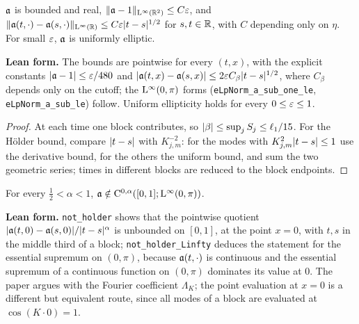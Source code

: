 \begin{proposition}
  \label{prop:coefficient}
  \leanok
  $\mathfrak{a}$ is bounded and real, $\lVert \mathfrak{a}-1\rVert_{\mathrm{L}^\infty(\mathbb{R}^2)}\leq C\varepsilon$, and
  $\lVert \mathfrak{a}(t,\cdot)-\mathfrak{a}(s,\cdot)\rVert_{\mathrm{L}^\infty(\mathbb{R})}\leq C\varepsilon\lvert t-s\rvert^{1/2}$ for $s,t\in\mathbb{R}$,
  with $C$ depending only on $\eta$.  For small $\varepsilon$, $\mathfrak{a}$ is uniformly elliptic.
\end{proposition}

\textbf{Lean form.}  The bounds are pointwise for every $(t,x)$, with the explicit constants
$\lvert \mathfrak{a}-1\rvert\leq\varepsilon/480$ and $\lvert \mathfrak{a}(t,x)-\mathfrak{a}(s,x)\rvert\leq2\varepsilon C_\beta\lvert t-s\rvert^{1/2}$, where
$C_\beta$ depends only on the cutoff; the $\mathrm{L}^\infty(0,\pi)$ forms
(\texttt{eLpNorm\_a\_sub\_one\_le}, \texttt{eLpNorm\_a\_sub\_le}) follow.  Uniform ellipticity
holds for every $0\leq\varepsilon\leq1$.

\begin{proof}
  \leanok
  At each time one block contributes, so $\lvert \beta\rvert\leq\sup_jS_j\leq\ell_1/15$.  For the
  H\"older bound, compare $\lvert t-s\rvert$ with $K_{j,m}^{-2}$: for the modes with
  $K_{j,m}^2\lvert t-s\rvert\leq1$ use the derivative bound, for the others the uniform bound, and sum
  the two geometric series; times in different blocks are reduced to the block endpoints.
\end{proof}

\begin{proposition}
  \label{prop:holder-sharp}
  \leanok
  For every $\frac12<\alpha<1$, $\mathfrak{a}\notin\mathrm{C}^{0,\alpha}([0,1];\mathrm{L}^\infty(0,\pi))$.
\end{proposition}

\textbf{Lean form.}  \texttt{not\_holder} shows that the pointwise quotient
$\lvert \mathfrak{a}(t,0)-\mathfrak{a}(s,0)\rvert/\lvert t-s\rvert^\alpha$ is unbounded on $[0,1]$, at the point $x=0$, with
$t,s$ in the middle third of a block; \texttt{not\_holder\_Linfty} deduces the statement for the
essential supremum on $(0,\pi)$, because $\mathfrak{a}(t,\cdot)$ is continuous and the essential supremum
of a continuous function on $(0,\pi)$ dominates its value at $0$.  The paper argues with the
Fourier coefficient $\Lambda_K$; the point evaluation at $x=0$ is a different but equivalent route,
since all modes of a block are evaluated at $\cos(K\cdot0)=1$.

